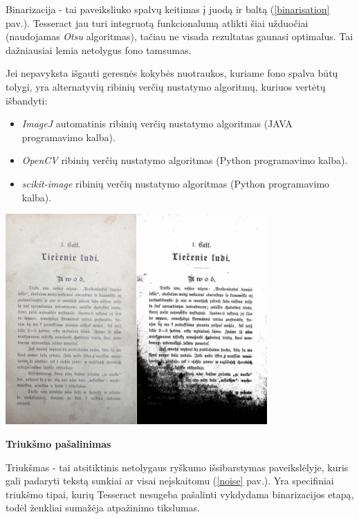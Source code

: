 \documentclass{VUMIFInfBakalaurinis}
\begin{document}
Binarizacija - tai paveiksliuko spalvų keitimas į juodą ir baltą (\ref{binarisation} pav.). Tesseract jau turi integruotą funkcionalumą atlikti šiai užduočiai (naudojamas \textit{Otsu} algoritmas),
tačiau ne visada rezultatas gaunasi optimalus. Tai dažniausiai lemia netolygus fono tamsumas.

Jei nepavyksta išgauti geresnės kokybės nuotraukos, kuriame fono spalva būtų tolygi, yra alternatyvių ribinių verčių nustatymo algoritmų, kuriuos vertėtų išbandyti:
\begin{itemize}[itemsep=0.5pt]
  \item \textit{ImageJ} automatinis ribinių verčių nustatymo algoritmas (JAVA programavimo kalba).
  \item \textit{OpenCV} ribinių verčių nustatymo algoritmas (Python programavimo kalba).
  \item \textit{scikit-image} ribinių verčių nustatymo algoritmas (Python programavimo kalba).
\end{itemize}

\begin{minipage}{\linewidth}
  \centering
  \includegraphics[width=10cm]{binarisation.png}
  \label{binarisation}
\end{minipage}

\textbf{Triukšmo pašalinimas}

Triukšmas - tai atsitiktinis netolygaus ryškumo išsibarstymas paveikslėlyje, kuris gali padaryti tekstą sunkiai ar visai neįskaitomu (\ref{noise} pav.).
Yra specifiniai triukšmo tipai, kurių Tesseract nesugeba pašalinti vykdydama binarizacijos etapą, todėl ženkliai sumažėja atpažinimo tikslumas.
\end{document}
